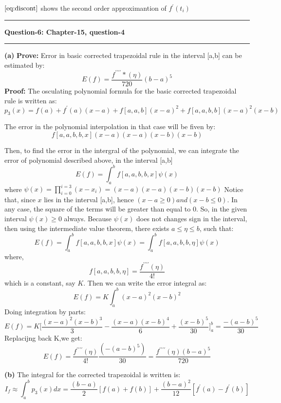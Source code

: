 \documentclass{article}
\newcommand\question[2]{\vspace{.25in}\hrule\textbf{#1: #2}\hrule\vspace{.10in}}
\renewcommand\part[1]{\vspace{.10in}\textbf{(#1)}}
\begin{document}
  $\eqref{eq:discont}$ shows the second order approximantion of $f^\prime(t_i)$



  

  \question{Question-6}{Chapter-15, question-4}
  \part{a} \textbf {Prove:} Error in basic corrected trapezoidal rule in the interval [a,b] can be estimated by:
  \[E(f) = \dfrac{f^{\prime\prime\prime\prime}*(\eta)}{720} (b-a)^5\]
  \textbf {Proof:} The osculating polynomial formula for the basic corrected trapezoidal rule is written as:
  \[p_3(x) = f(a) + f^\prime(a)(x-a) + f[a,a,b](x-a)^2 + f[a,a,b,b](x-a)^2(x-b)\]

  The error in the polynomial interpolation in that case will be fiven by:
  \[f[a,a,b,b,x](x-a)(x-a)(x-b)(x-b)\]

  Then, to find the error in the intergral of the polynomial, we can integrate the error of polynomial described above, in the interval [a,b]
  \[E(f) = \int_{a}^{b} f[a,a,b,b,x]\psi(x)\]
  where $\psi(x) = \prod_{i=0}^{i=3}(x - x_i) = (x-a)(x-a)(x-b)(x-b)$ \newline
  Notice that, since $x$ lies in the interval [a,b], hence $(x-a \geq 0) and (x-b \leq 0)$. In any case, the square of the terms will be greater than equal to 0. So, in the given interval $\psi(x) \geq 0$ always. Because $\psi(x)$ does not changes sign in the interval, then using the intermediate value theorem, there exists $a \leq \eta \leq b$, such that:
  \[E(f) = \int_{a}^{b} f[a,a,b,b,x]\psi(x) = \int_{a}^{b} f[a,a,b,b,\eta]\psi(x)\]
  where,
  \[f[a,a,b,b,\eta] = \dfrac{f^{\prime\prime\prime\prime}(\eta)}{4!}\]
  which is a constant, say $K$. \newline
  Then we can write the error integral as:
  \[E(f) = K \int_{a}^{b} (x-a)^2(x-b)^2 \]
  Doing integration by parts:
  \[E(f) = K\bigg [ \dfrac{(x-a)^2(x-b)^3}{3} - \dfrac{(x-a)(x-b)^4}{6} + \dfrac{(x - b)^5}{30}    \bigg ]_{a}^{b} = \dfrac{-(a-b)^5}{30}\]
  Replacijng back K,we get:
  \[E(f) = \dfrac{f^{\prime\prime\prime\prime}(\eta)}{4!}\dfrac{(-(a-b)^5)}{30} = \dfrac{f^{\prime\prime\prime\prime}(\eta)(b-a)^5}{720} \]

  \part{b} The integral for the corrected trapezoidal is written is:
  \[ I_f \approx \int_{a}^{b} p_3(x)dx = \dfrac{(b-a)}{2}[f(a) + f(b)] + \dfrac{(b-a)^2}{12}[f^\prime(a) - f^\prime(b)] \]
\end{document}
